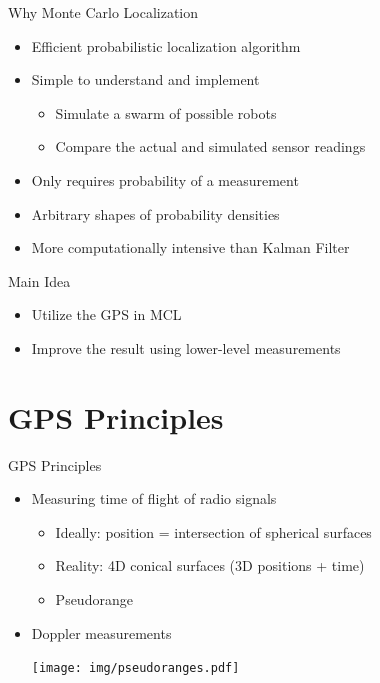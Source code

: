 \documentclass[utf8,12pt]{beamer}
\begin{document}
{
\begin{frame}{Why Monte Carlo Localization}
\begin{itemize}
    \item Efficient probabilistic localization algorithm
    \item Simple to understand and implement
    \begin{itemize}
        \item Simulate a swarm of possible robots
        \item Compare the actual and simulated sensor readings
    \end{itemize}
    \item Only requires probability of a measurement
    \item Arbitrary shapes of probability densities
    \item More computationally intensive than Kalman Filter
\end{itemize}
\end{frame}
}

\begin{frame}{Main Idea}
\begin{itemize}
    \item Utilize the GPS in MCL
    \item Improve the result using lower-level measurements
\end{itemize}
\end{frame}

\section{GPS Principles}
\begin{frame}{GPS Principles}
    \begin{itemize}
        \item Measuring time of flight of radio signals
        \begin{itemize}
            \item Ideally: position = intersection of spherical surfaces
            \item Reality: 4D conical surfaces (3D positions + time)
            \item Pseudorange
        \end{itemize}
        \item Doppler measurements
    \vspace{0.5cm}
    \begin{center}
    \centerline{\texttt{[image: img/pseudoranges.pdf]}}
    \end{center}
    \end{itemize}
\end{frame}
\end{document}
